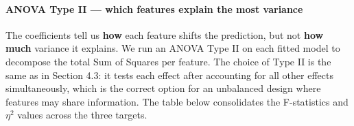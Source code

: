 \paragraph{ANOVA Type II --- which features explain the most
variance}\label{anova-type-ii-which-features-explain-the-most-variance}

The coefficients tell us \textbf{how} each feature shifts the
prediction, but not \textbf{how much} variance it explains. We run an
ANOVA Type II on each fitted model to decompose the total Sum of Squares
per feature. The choice of Type II is the same as in Section 4.3: it
tests each effect after accounting for all other effects simultaneously,
which is the correct option for an unbalanced design where features may
share information. The table below consolidates the F-statistics and
\(\eta^2\) values across the three targets.

